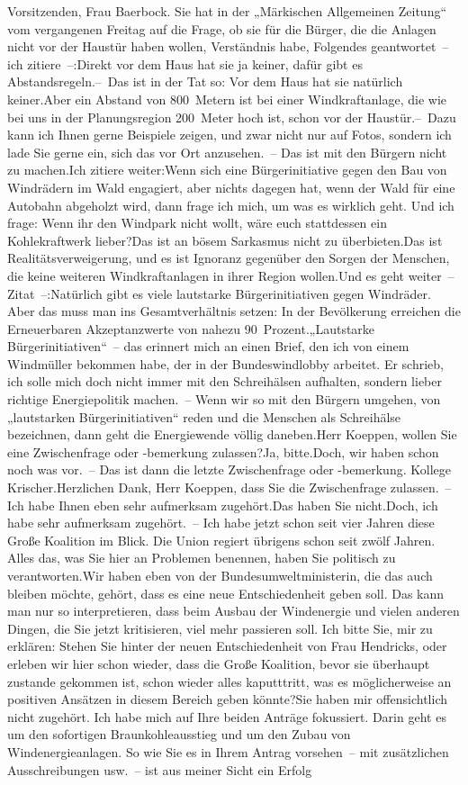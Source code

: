 \documentclass{article}
\begin{document}
Vorsitzenden, Frau Baerbock. Sie hat in der „Märkischen Allgemeinen Zeitung“ vom vergangenen Freitag auf die Frage, ob sie für die Bürger, die die Anlagen nicht vor der Haustür haben wollen, Verständnis habe, Folgendes geantwortet – ich zitiere –:Direkt vor dem Haus hat sie ja keiner, dafür gibt es Abstandsregeln.– Das ist in der Tat so: Vor dem Haus hat sie natürlich keiner.Aber ein Abstand von 800 Metern ist bei einer Windkraftanlage, die wie bei uns in der Planungsregion 200 Meter hoch ist, schon vor der Haustür.– Dazu kann ich Ihnen gerne Beispiele zeigen, und zwar nicht nur auf Fotos, sondern ich lade Sie gerne ein, sich das vor Ort anzusehen. – Das ist mit den Bürgern nicht zu machen.Ich zitiere weiter:Wenn sich eine Bürgerinitiative gegen den Bau von Windrädern im Wald engagiert, aber nichts dagegen hat, wenn der Wald für eine Autobahn abgeholzt wird, dann frage ich mich, um was es wirklich geht. Und ich frage: Wenn ihr den Windpark nicht wollt, wäre euch stattdessen ein Kohlekraftwerk lieber?Das ist an bösem Sarkasmus nicht zu überbieten.Das ist Realitätsverweigerung, und es ist Ignoranz gegenüber den Sorgen der Menschen, die keine weiteren Windkraftanlagen in ihrer Region wollen.Und es geht weiter – Zitat –:Natürlich gibt es viele lautstarke Bürgerinitiativen gegen Windräder. Aber das muss man ins Gesamtverhältnis setzen: In der Bevölkerung erreichen die Erneuerbaren Akzeptanzwerte von nahezu 90 Prozent.„Lautstarke Bürgerinitiativen“ – das erinnert mich an einen Brief, den ich von einem Windmüller bekommen habe, der in der Bundeswindlobby arbeitet. Er schrieb, ich solle mich doch nicht immer mit den Schreihälsen aufhalten, sondern lieber richtige Energiepolitik machen. – Wenn wir so mit den Bürgern umgehen, von „lautstarken Bürgerinitiativen“ reden und die Menschen als Schreihälse bezeichnen, dann geht die Energiewende völlig daneben.Herr Koeppen, wollen Sie eine Zwischenfrage oder -bemerkung zulassen?Ja, bitte.Doch, wir haben schon noch was vor. – Das ist dann die letzte Zwischenfrage oder -bemerkung. Kollege Krischer.Herzlichen Dank, Herr Koeppen, dass Sie die Zwischenfrage zulassen. – Ich habe Ihnen eben sehr aufmerksam zugehört.Das haben Sie nicht.Doch, ich habe sehr aufmerksam zugehört. – Ich habe jetzt schon seit vier Jahren diese Große Koalition im Blick. Die Union regiert übrigens schon seit zwölf Jahren. Alles das, was Sie hier an Problemen benennen, haben Sie politisch zu verantworten.Wir haben eben von der Bundesumweltministerin, die das auch bleiben möchte, gehört, dass es eine neue Entschiedenheit geben soll. Das kann man nur so interpretieren, dass beim Ausbau der Windenergie und vielen anderen Dingen, die Sie jetzt kritisieren, viel mehr passieren soll. Ich bitte Sie, mir zu erklären: Stehen Sie hinter der neuen Entschiedenheit von Frau Hendricks, oder erleben wir hier schon wieder, dass die Große Koalition, bevor sie überhaupt zustande gekommen ist, schon wieder alles kaputttritt, was es möglicherweise an positiven Ansätzen in diesem Bereich geben könnte?Sie haben mir offensichtlich nicht zugehört. Ich habe mich auf Ihre beiden Anträge fokussiert. Darin geht es um den sofortigen Braunkohleausstieg und um den Zubau von Windenergieanlagen. So wie Sie es in Ihrem Antrag vorsehen – mit zusätzlichen Ausschreibungen usw. – ist aus meiner Sicht ein Erfolg 
\end{document}
